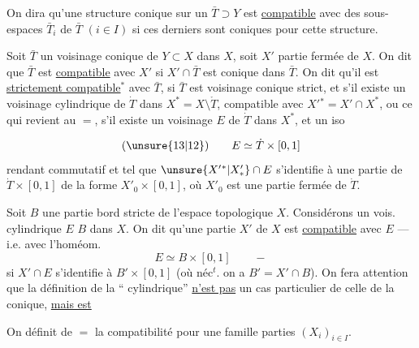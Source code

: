 On dira qu'une structure conique sur
un $\bar T\supset Y$ est \uline{compatible} avec des sous-espaces
 $\bar T_i$ de $\bar T$ $(i\in I)$ si ces derniers
sont coniques pour cette structure.

Soit $\bar T$ un voisinage conique de $Y\subset X$
dans $X$, soit $X'$ partie fermée de $X$. On
dit que $\bar T$ est \uline{compatible} avec $X'$ si
$X'\cap\bar T$ est conique dans $\bar T$. On dit qu'il
est \uline{strictement compatible}$^{*}$ avec $\bar T$, si
$\bar T$ est voisinage conique strict, et s'il existe
un voisinage cylindrique de $\dot T$ dans
$X^*=X\setminus\mathring T$, compatible avec
$X'{}^*=X'\cap X^*$,
ou ce qui revient au $=$, s'il existe un
voisinage $E$ de $\dot T$ dans $X^*$, et un iso

\[
(\unsure{13|12})\qquad E\simeq\dot T\times[0,1]
\]
rendant commutatif
et tel que $\unsure{X'{}^*|X'_*}\cap E$ s'identifie à une partie
de $\dot T\times[0,1]$ de la forme $X'_0\times[0,1]$, où $X'_0$
est une partie fermée de $\dot T$.

Soit $B$ une partie bord stricte de l'espace
topologique $X$. Considérons un vois.
cylindrique $E$  $B$ dans $X$. On
dit qu'une partie  $X'$ de $X$ est \uline{compatible}
avec $E$ --- i.e. avec l'homéom.
\[
E\simeq B\times[0,1]\qquad -
\]
si $X'\cap E$ s'identifie à $B'\times[0,1]$
(où néc$^t$. on a $B'=X'\cap B$).
On fera attention que la définition de la
``
 cylindrique'' \uline{n'est pas} un cas
particulier de celle de la 
conique, \uline{mais est}

On définit de $=$ la compatibilité pour
une famille   parties $(X_i)_{i\in I}$.

